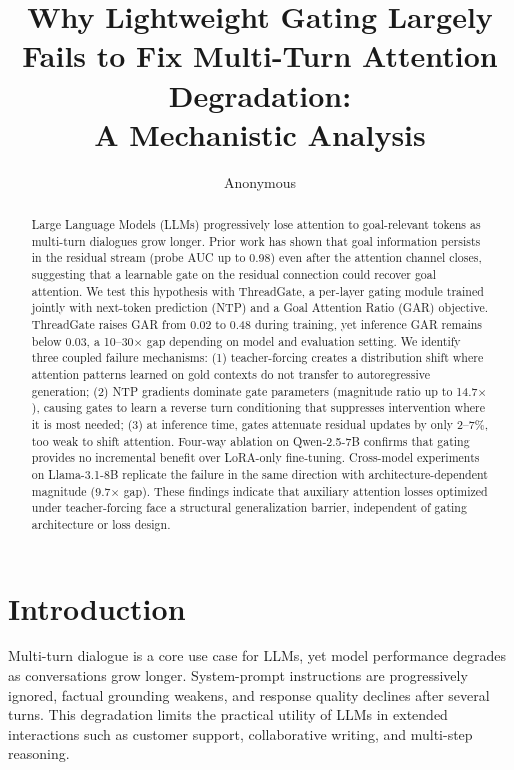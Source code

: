 \documentclass[11pt,a4paper]{article}
\title{Why Lightweight Gating Largely Fails to Fix Multi-Turn Attention Degradation:\\A Mechanistic Analysis}
\author{Anonymous}
\date{}
\begin{document}
\maketitle

\begin{abstract}
Large Language Models (LLMs) progressively lose attention to goal-relevant tokens as multi-turn dialogues grow longer.
Prior work has shown that goal information persists in the residual stream (probe AUC up to 0.98) even after the attention channel closes, suggesting that a learnable gate on the residual connection could recover goal attention.
We test this hypothesis with ThreadGate, a per-layer gating module trained jointly with next-token prediction (NTP) and a Goal Attention Ratio (GAR) objective.
ThreadGate raises GAR from 0.02 to 0.48 during training, yet inference GAR remains below 0.03, a 10--30$\times$ gap depending on model and evaluation setting.
We identify three coupled failure mechanisms: (1) teacher-forcing creates a distribution shift where attention patterns learned on gold contexts do not transfer to autoregressive generation; (2) NTP gradients dominate gate parameters (magnitude ratio up to 14.7$\times$), causing gates to learn a reverse turn conditioning that suppresses intervention where it is most needed; (3) at inference time, gates attenuate residual updates by only 2--7\%, too weak to shift attention.
Four-way ablation on Qwen-2.5-7B confirms that gating provides no incremental benefit over LoRA-only fine-tuning.
Cross-model experiments on Llama-3.1-8B replicate the failure in the same direction with architecture-dependent magnitude (9.7$\times$ gap).
These findings indicate that auxiliary attention losses optimized under teacher-forcing face a structural generalization barrier, independent of gating architecture or loss design.
\end{abstract}

\section{Introduction}

Multi-turn dialogue is a core use case for LLMs, yet model performance degrades as conversations grow longer.
System-prompt instructions are progressively ignored, factual grounding weakens, and response quality declines after several turns.
This degradation limits the practical utility of LLMs in extended interactions such as customer support, collaborative writing, and multi-step reasoning.
\end{document}
